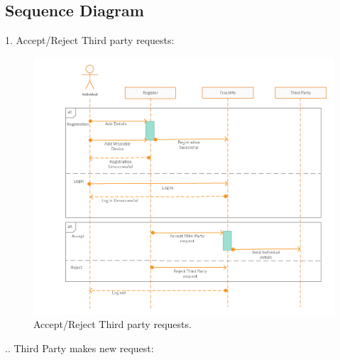 \subsection{Sequence Diagram}
1. Accept/Reject Third party requests:
\begin{figure}[H]
	\begin{center}
		\includegraphics[width=\textwidth]{./RASD_Sequence/1__Individual.png}
      	\caption{Accept/Reject Third party requests.}
        \label{TrackMe_seq1}
	\end{center}
\end{figure}
.\newline\newline\newline\newline\newline\newline\newline\newline\newline\newline{}. Third Party makes new request:
